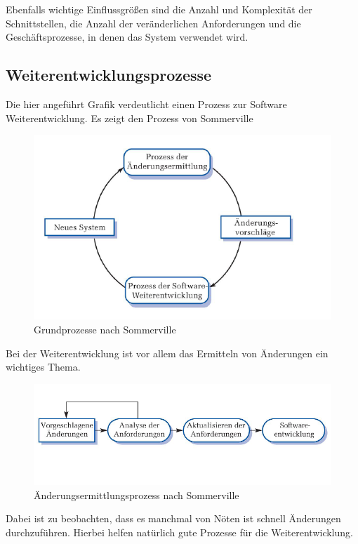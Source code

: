 Ebenfalls wichtige Einflussgrößen sind die Anzahl und Komplexität der Schnittstellen, die Anzahl der veränderlichen Anforderungen und die Geschäftsprozesse, in denen das System verwendet wird.

\subsection{Weiterentwicklungsprozesse}
Die hier angeführt Grafik verdeutlicht einen Prozess zur Software Weiterentwicklung. Es zeigt den Prozess von Sommerville 
\begin{figure}[hbtp]
\centering
\includegraphics[scale=0.5]{document/graphics/Weiterentwicklungsprozess.png} 
\caption{Grundprozesse nach Sommerville}
\end{figure}

Bei der Weiterentwicklung ist vor allem das Ermitteln von Änderungen ein wichtiges Thema.

\begin{figure}[hbtp]
\centering
\includegraphics[scale=0.5]{document/graphics/Aenderungsermittlungsprozess.png} 
\caption{Änderungsermittlungsprozess nach Sommerville}
\end{figure}

Dabei ist zu beobachten, dass es manchmal von Nöten ist schnell Änderungen durchzuführen. Hierbei helfen natürlich gute Prozesse für die Weiterentwicklung.